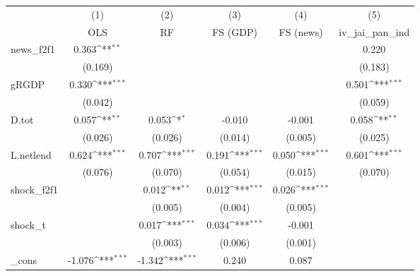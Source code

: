 {
\def\sym#1{\ifmmode^{#1}\else\(^{#1}\)\fi}
\begin{tabular}{l*{5}{c}}
\toprule
            &\multicolumn{1}{c}{(1)}&\multicolumn{1}{c}{(2)}&\multicolumn{1}{c}{(3)}&\multicolumn{1}{c}{(4)}&\multicolumn{1}{c}{(5)}\\
            &\multicolumn{1}{c}{OLS}&\multicolumn{1}{c}{RF}&\multicolumn{1}{c}{FS (GDP)}&\multicolumn{1}{c}{FS (news)}&\multicolumn{1}{c}{iv\_jai\_pan\_ind}\\
\midrule
news\_f2f1   &       0.363\sym{**} &                     &                     &                     &       0.220         \\
            &     (0.169)         &                     &                     &                     &     (0.183)         \\
\addlinespace
gRGDP       &       0.330\sym{***}&                     &                     &                     &       0.501\sym{***}\\
            &     (0.042)         &                     &                     &                     &     (0.059)         \\
\addlinespace
D.tot       &       0.057\sym{**} &       0.053\sym{*}  &      -0.010         &      -0.001         &       0.058\sym{**} \\
            &     (0.026)         &     (0.026)         &     (0.014)         &     (0.005)         &     (0.025)         \\
\addlinespace
L.netlend   &       0.624\sym{***}&       0.707\sym{***}&       0.191\sym{***}&       0.050\sym{***}&       0.601\sym{***}\\
            &     (0.076)         &     (0.070)         &     (0.054)         &     (0.015)         &     (0.070)         \\
\addlinespace
shock\_f2f1  &                     &       0.012\sym{**} &       0.012\sym{***}&       0.026\sym{***}&                     \\
            &                     &     (0.005)         &     (0.004)         &     (0.005)         &                     \\
\addlinespace
shock\_t     &                     &       0.017\sym{***}&       0.034\sym{***}&      -0.001         &                     \\
            &                     &     (0.003)         &     (0.006)         &     (0.001)         &                     \\
\addlinespace
\_cons      &      -1.076\sym{***}&      -1.342\sym{***}&       0.240         &       0.087         &                     \\

\end{tabular}}
